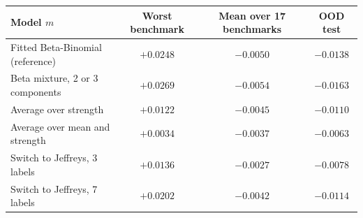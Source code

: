 \begin{tabular}{lccc}
\toprule
Model $m$ & Worst benchmark & Mean over 17 benchmarks & OOD test \\
\midrule
Fitted Beta-Binomial (reference) & $+0.0248$ & $\minus0.0050$ & $\minus0.0138$ \\
\midrule
Beta mixture, 2 or 3 components & $+0.0269$ & $\mathbf{\minus0.0054}$ & $\mathbf{\minus0.0163}$ \\
Average over strength & $+0.0122$ & $\minus0.0045$ & $\minus0.0110$ \\
Average over mean and strength & $\mathbf{+0.0034}$ & $\minus0.0037$ & $\minus0.0063$ \\
Switch to Jeffreys, 3 labels & $+0.0136$ & $\minus0.0027$ & $\minus0.0078$ \\
Switch to Jeffreys, 7 labels & $+0.0202$ & $\minus0.0042$ & $\minus0.0114$ \\
\bottomrule
\end{tabular}
